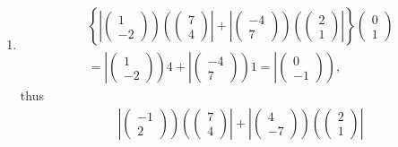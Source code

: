 \documentclass[aps,preprint]{revtex4}
\begin{document}
\begin{enumerate}
\item 
\begin{align}
& \left\{ \left\vert \left( 
\begin{array}{c}
1 \\ 
-2%
\end{array}%
\right) \right) \left( \left( 
\begin{array}{c}
7 \\ 
4%
\end{array}%
\right) \right\vert +\left\vert \left( 
\begin{array}{c}
-4 \\ 
7%
\end{array}%
\right) \right) \left( \left( 
\begin{array}{c}
2 \\ 
1%
\end{array}%
\right) \right\vert \right\} \left( 
\begin{array}{c}
0 \\ 
1%
\end{array}%
\right) \\
& =\left\vert \left( 
\begin{array}{c}
1 \\ 
-2%
\end{array}%
\right) \right) 4+\left\vert \left( 
\begin{array}{c}
-4 \\ 
7%
\end{array}%
\right) \right) 1=\left\vert \left( 
\begin{array}{c}
0 \\ 
-1%
\end{array}%
\right) \right) ,
\end{align}%
thus%
\begin{align}
& \left\vert \left( 
\begin{array}{c}
-1 \\ 
2%
\end{array}%
\right) \right) \left( \left( 
\begin{array}{c}
7 \\ 
4%
\end{array}%
\right) \right\vert +\left\vert \left( 
\begin{array}{c}
4 \\ 
-7%
\end{array}%
\right) \right) \left( \left( 
\begin{array}{c}
2 \\ 
1%
\end{array}%
\right) \right\vert \\

\end{align}
\end{enumerate}
\end{document}
